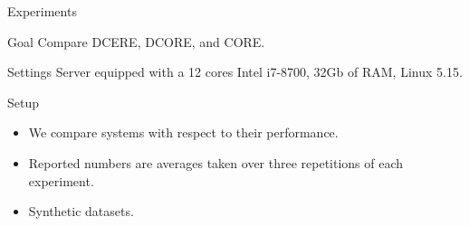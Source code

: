 \documentclass[xcolor=pdftex,dvipsnames,table]{beamer}
\begin{document}


\begin{frame}[fragile]{Experiments}
  \begin{block}{Goal}
    Compare DCERE, DCORE, and CORE.
  \end{block}
  \begin{block}{Settings}
    Server equipped with a 12 cores Intel i7-8700, 32Gb of RAM, Linux 5.15.
  \end{block}
  \begin{block}{Setup}
    \begin{itemize}
      \item We compare systems with respect to their performance.
      \item Reported numbers are averages taken over three repetitions of each experiment.
      \item Synthetic datasets.
    \end{itemize}
  \end{block}
\end{frame}
\end{document}
